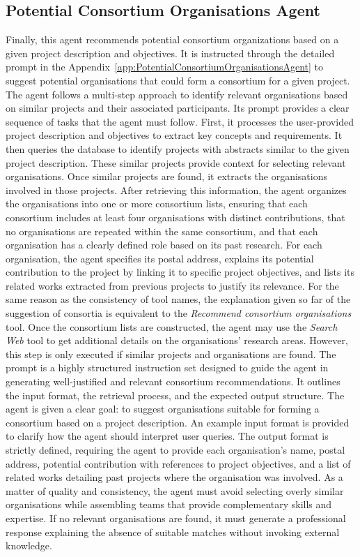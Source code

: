 \subsection*{Potential Consortium Organisations Agent}
Finally, this agent recommends potential consortium organizations based on a given project description and objectives.
It is instructed through the detailed prompt in the Appendix~\ref{app:PotentialConsortiumOrganisationsAgent} to suggest potential organisations that could form a consortium for a given project.
The agent follows a multi-step approach to identify relevant organisations based on similar projects and their associated participants.
Its prompt provides a clear sequence of tasks that the agent must follow.
First, it processes the user-provided project description and objectives to extract key concepts and requirements.
It then queries the database to identify projects with abstracts similar to the given project description.
These similar projects provide context for selecting relevant organisations.
Once similar projects are found, it extracts the organisations involved in those projects.
After retrieving this information, the agent organizes the organisations into one or more consortium lists, ensuring that each consortium includes at least four organisations with distinct contributions, that no organisations are repeated within the same consortium, and that each organisation has a clearly defined role based on its past research.
For each organisation, the agent specifies its postal address, explains its potential contribution to the project by linking it to specific project objectives, and lists its related works extracted from previous projects to justify its relevance.
For the same reason as the consistency of tool names, the explanation given so far of the suggestion of consortia is equivalent to the \textit{Recommend consortium organisations} tool.
Once the consortium lists are constructed, the agent may use the \textit{Search Web} tool to get additional details on the organisations' research areas.
However, this step is only executed if similar projects and organisations are found.
The prompt is a highly structured instruction set designed to guide the agent in generating well-justified and relevant consortium recommendations.
It outlines the input format, the retrieval process, and the expected output structure.
The agent is given a clear goal: to suggest organisations suitable for forming a consortium based on a project description.
An example input format is provided to clarify how the agent should interpret user queries.
The output format is strictly defined, requiring the agent to provide each organisation's name, postal address, potential contribution with references to project objectives, and a list of related works detailing past projects where the organisation was involved.
As a matter of quality and consistency, the agent must avoid selecting overly similar organisations while assembling teams that provide complementary skills and expertise.
If no relevant organisations are found, it must generate a professional response explaining the absence of suitable matches without invoking external knowledge.

